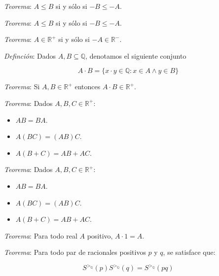 \documentclass{beamer}
\begin{document}
  \begin{frame}
    \textit{Teorema}: $A \leq B$ si y sólo si $-B \leq -A$.
  \end{frame}

  \begin{frame}
    \textit{Teorema}: $A \leq B$ si y sólo si $-B \leq -A$.
    \newline\newline

    \textit{Teorema}: $A \in \mathbb{R}^+$ si y sólo si $-A \in \mathbb{R}^-$.
  \end{frame}

  \begin{frame}
    \textit{Definción}: Dados $A, B \subseteq \mathbb{Q}$, denotamos el 
    siguiente conjunto

    \[A \cdot B = \{x \cdot y \in \mathbb{Q}: x \in A \land y \in B\}\]
  \end{frame}

  \begin{frame}
    \textit{Teorema}: Si $A, B \in \mathbb{R}^+$ entonces $A \cdot B \in \mathbb{R}^+$.
  \end{frame}

  \begin{frame}
    \textit{Teorema}: Dados $A, B, C \in \mathbb{R}^+$:

    \begin{itemize}
      \item $AB = BA$.
      \item $A(BC) = (AB)C$.
      \item $A(B + C) = AB + AC$.
    \end{itemize}
  \end{frame}

  \begin{frame}
    \textit{Teorema}: Dados $A, B, C \in \mathbb{R}^+$:

    \begin{itemize}
      \item $AB = BA$.
      \item $A(BC) = (AB)C$.
      \item $A(B + C) = AB + AC$.
    \end{itemize}

    \textit{Teorema}: Para todo real $A$ positivo, $A \cdot 1 = A$.
  \end{frame}

  \begin{frame}
    \textit{Teorema}: Para todo par de racionales positivos $p$ y $q$, se 
    satisface que:

    \[S^{>_\mathbb{Q}}(p) S^{>_\mathbb{Q}}(q) = S^{>_\mathbb{Q}}(pq)\]
  \end{frame}
\end{document}
